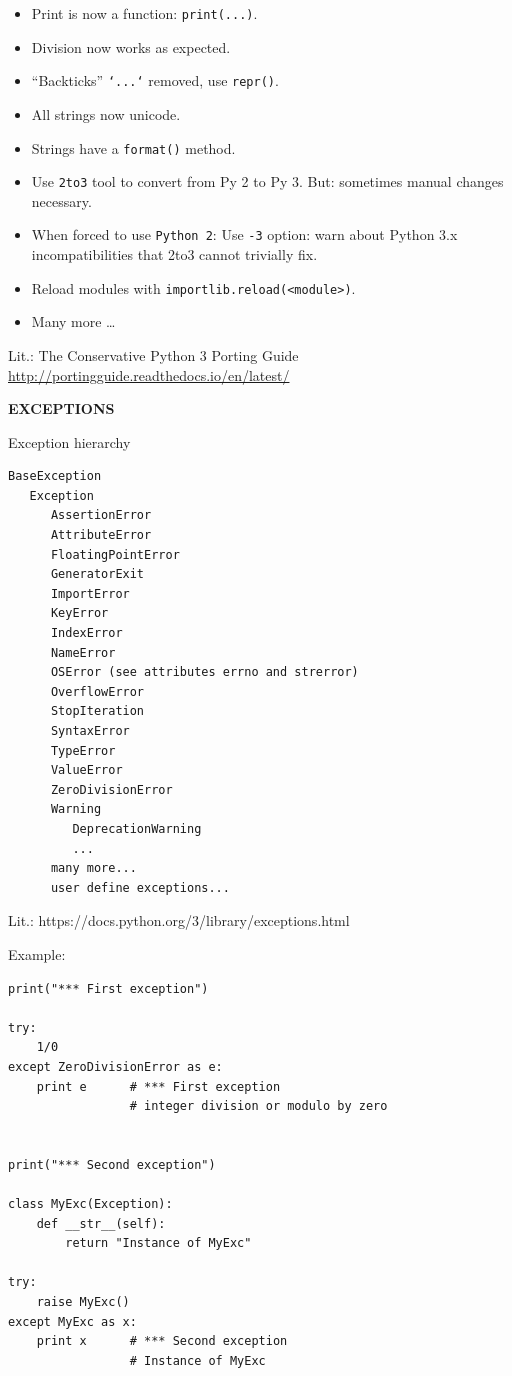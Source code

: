 \documentclass[9pt,a4wide]{extarticle}
\begin{document}
\begin{itemize}
\item Print is now a function: {\tt print(...)}.
\item Division now works as expected.
\item  "`Backticks"' {\tt `...`} removed, use {\tt repr()}.
\item All strings now unicode.
\item Strings have a {\tt format()} method.
\item Use {\tt 2to3} tool to convert from Py 2 to Py 3. But: sometimes
   manual changes necessary.
\item When forced to use {\tt Python 2}: Use {\tt -3} option: warn about 
   Python 3.x incompatibilities that 2to3 cannot trivially fix.
\item Reload modules with {\tt importlib.reload(<module>)}. 
\item Many more \dots{}

\end{itemize}

Lit.: The Conservative Python 3 Porting Guide
      \url{http://portingguide.readthedocs.io/en/latest/}


\bigskip
{\LARGE\bf EXCEPTIONS}

Exception hierarchy

\begin{verbatim}
BaseException
   Exception
      AssertionError
      AttributeError
      FloatingPointError
      GeneratorExit
      ImportError
      KeyError
      IndexError
      NameError
      OSError (see attributes errno and strerror)
      OverflowError
      StopIteration
      SyntaxError
      TypeError
      ValueError
      ZeroDivisionError
      Warning
         DeprecationWarning
         ...
      many more...
      user define exceptions...
\end{verbatim}

Lit.: https://docs.python.org/3/library/exceptions.html

\medskip

Example:

\medskip

\begin{verbatim}
print("*** First exception")

try:
    1/0
except ZeroDivisionError as e:
    print e      # *** First exception
                 # integer division or modulo by zero


print("*** Second exception")

class MyExc(Exception):
    def __str__(self):
        return "Instance of MyExc"

try:
    raise MyExc()
except MyExc as x:
    print x      # *** Second exception
                 # Instance of MyExc
\end{verbatim}
\end{document}
